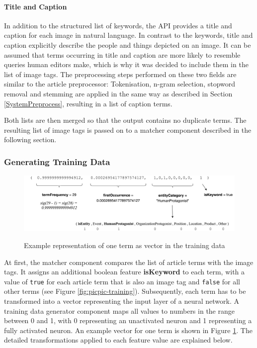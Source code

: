 \documentclass[11pt,a4paper,twoside]{article}
\begin{document}
\paragraph{Title and Caption} In addition to the structured list of keywords, the API provides a title and caption for each image in natural language. In contrast to the keywords, title and caption explicitly describe the people and things depicted on an image. It can be assumed that terms occurring in title and caption are more likely to resemble queries human editors make, which is why it was decided to include them in the list of image tags. The preprocessing steps performed on these two fields are similar to the article preprocessor: Tokenisation, n-gram selection, stopword removal and stemming are applied in the same way as described in Section \ref{SystemPreprocess}, resulting in a list of caption terms.

Both lists are then merged so that the output contains no duplicate terms. The resulting list of image tags is passed on to a matcher component described in the following section.

\subsubsection{Generating Training Data} \label{SystemTrainGenerate}

\begin{figure}[h]
    \caption{Example representation of one term as vector in the training data}
    \centering
    \includegraphics[width=\columnwidth]{example-training-term.png}
    \label{fig:example-training-term}
\end{figure}

\noindent At first, the matcher component compares the list of article terms with the image tags. It assigns an additional boolean feature \textbf{isKeyword} to each term, with a value of \lstinline{true} for each article term that is also an image tag and \lstinline{false} for all other terms (see Figure \ref{fig:picpic-training}). Subsequently, each term has to be transformed into a vector representing the input layer of a neural network. A training data generator component maps all values to numbers in the range between 0 and 1, with 0 representing an unactivated neuron and 1 representing a fully activated neuron. An example vector for one term is shown in Figure \ref{fig:example-training-term}. The detailed transformations applied to each feature value are explained below.
\end{document}
